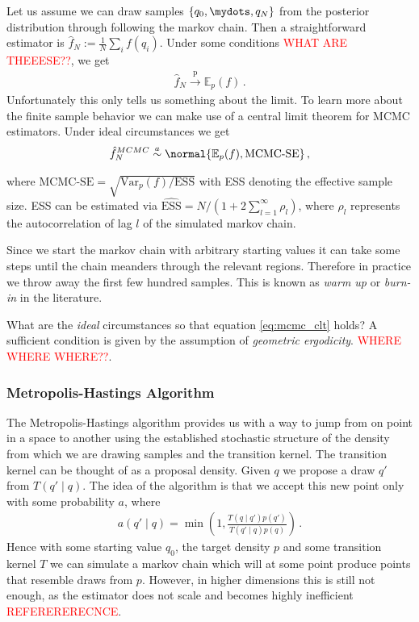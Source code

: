 Let us assume we can draw samples $\{q_0, \mydots, q_N\}$ from the posterior distribution through following
the markov chain. Then a straightforward estimator is $\hat{f}_N := \frac{1}{N} \sum_i f(q_i)$.
Under some conditions \textcolor{red}{WHAT ARE THEEESE??}, we get
\begin{align}
  \hat{f}_N \overset{\mathrm{p}}{\longrightarrow} \mathbb{E}_p(f) \,.
\end{align}
Unfortunately this only tells us something about the limit. To learn more about the
finite sample behavior we can make use of a central limit theorem for MCMC estimators.
Under ideal circumstances we get
\begin{align}
  \hat{f}_N^{MCMC} \overset{a}{\sim} \normal{\mathbb{E}_p(f), \text{MCMC-SE}} \,,
  \label{eq:mcmc_clt}
\end{align}

where $\text{MCMC-SE} = \sqrt{\text{Var}_p(f) / \text{ESS}}$ with ESS denoting the effective sample size.
ESS can be estimated via $\hat{\text{ESS}} = N / (1 + 2 \sum_{l=1}^\infty \rho_l)$, where $\rho_l$ represents
the autocorrelation of lag $l$ of the simulated markov chain.

Since we start the markov chain with arbitrary starting values it can take some
steps until the chain meanders through the relevant regions. Therefore in practice
we throw away the first few hundred samples. This is known as \emph{warm up} or
\emph{burn-in} in the literature.

What are the \emph{ideal} circumstances so that equation \ref{eq:mcmc_clt} holds?
A sufficient condition is given by the assumption of \emph{geometric ergodicity}.
\textcolor{red}{WHERE WHERE WHERE??}.

\subsubsection*{Metropolis-Hastings Algorithm}
The Metropolis-Hastings algorithm provides us with a way to jump from on point
in a space to another using the established stochastic structure of the density
from which we are drawing samples and the transition kernel. The transition kernel
can be thought of as a proposal density. Given $q$ we propose a draw $q'$ from $T(q' \mid q)$.
The idea of the algorithm is that we accept this new point only with some probability $a$,
where
\begin{align}
  a(q' \mid q) = \min \left (1, \frac{T(q\mid q') p(q')}{T(q' \mid q) p(q)} \right) \,.
\end{align}
Hence with some starting value $q_0$, the target density $p$ and some transition kernel $T$
we can simulate a markov chain which will at some point produce points that resemble draws
from $p$. However, in higher dimensions this is still not enough, as the estimator does
not scale and becomes highly inefficient \textcolor{red}{REFERERERECNCE}.



